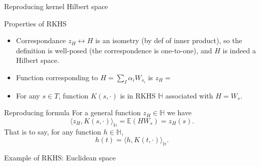 \begin{frame}[allowframebreaks]{Reproducing kernel Hilbert space}

\begin{alertblock}{Properties of RKHS}
	\begin{itemize}
		\item Correspondance $z_H \leftrightarrow H$ is an isometry (by def of inner product), so the definition is well-posed (the correspondence is one-to-one), and $H$ is indeed a Hilbert space.
		\item Function corresponding to $H=\sum_I \alpha_i W_{s_i}$ is \bigskip
			$z_H=$
		\item For any $s\in T$, function $K(s,\cdot)$ is in RKHS $\mathbb{H}$ associated with $H = W_s$.
	\end{itemize}
\end{alertblock}

\framebreak

\begin{alertblock}{Reproducing formula}
For a general function $z_H \in \mathbb{H}$ we have $$\langle z_H, K(s, \cdot)\rangle_{\mathbb{H}} = \mathbb{E}(H W_s) = z_H(s).$$
That is to say, for any function  $h \in \mathbb{H}$,
	$$h(t) = \langle h, K(t, \cdot)\rangle_{\mathbb{H}}.$$
\end{alertblock}

\end{frame}

\begin{frame}{Example of RKHS: Euclidean space}
%		
\end{frame}

